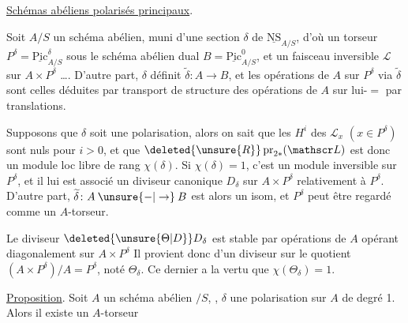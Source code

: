 
\uline{Schémas abéliens polarisés principaux}.

Soit $A/S$ un schéma abélien, muni d'une section $\delta$ de $\underline{\mathrm{NS}}_{A/S}$, d'où un torseur $P^\delta=\underline{\mathrm{Pic}}^\delta_{A/S}$ sous le schéma abélien dual $B=\underline{\mathrm{Pic}}^0_{A/S}$, et un faisceau inversible $\mathscr L$ sur $A\times P^\delta$ \ldots. D'autre part, $\delta$ définit $\widetilde\delta\colon A\longrightarrow B$, et les opérations de $A$ sur $P^\delta$ via $\widetilde\delta$ sont celles déduites par transport de structure des opérations de $A$ sur lui-$=$ par translations.

Supposons que $\delta$ soit une polarisation,  alors on sait que les $H^i$ des $\mathscr L_x$ $(x\in P^\delta)$ sont nuls pour $i>0$, et que $\deleted{\unsure{R}}\operatorname{pr}_{2*}(\mathscr L)$ est donc un module loc libre de rang $\chi(\delta)$. Si $\chi(\delta)=1$, c'est un module inversible sur $P^\delta$, et il lui est associé un diviseur canonique $D_\delta$ \deleted{$\unsure{\Theta_\delta|\Theta}$} sur $A\times P^\delta$ relativement à $P^\delta$. D'autre part, $\widetilde\delta\colon A\mathbin{\unsure{-|\to}}B$ est alors un isom, et $P^\delta$ peut être regardé comme un $A$-torseur.

 \deleted{\unsure{$\Theta$}} Le diviseur $\deleted{\unsure{\Theta|D}}D_\delta$ est stable par opérations de $A$ opérant diagonalement sur $A\times P^\delta$  Il provient donc d'un diviseur sur le quotient $(A\times P^\delta)/A=P^\delta$, noté  $\Theta_\delta$. Ce dernier a la vertu que $\chi(\Theta_\delta)=1$.

\uline{Proposition}. Soit $A$ un schéma abélien $/S$, ,  $\delta$ une polarisation sur $A$ de degré 1. Alors il existe un $A$-torseur
